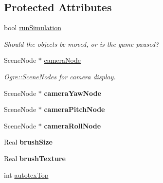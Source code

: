 \subsection*{\-Protected \-Attributes}
\begin{DoxyCompactItemize}
\item 
\hypertarget{classGame_a605bb1f3182700d52a031948b02c3fae}{
bool \hyperlink{classGame_a605bb1f3182700d52a031948b02c3fae}{run\-Simulation}}
\label{d9/d68/classGame_a605bb1f3182700d52a031948b02c3fae}

\begin{DoxyCompactList}\small\item\em \-Should the objects be moved, or is the game paused? \end{DoxyCompactList}\item 
\hypertarget{classGame_aaf382d31f78d134c461abc03b23ca27c}{
\-Scene\-Node $\ast$ \hyperlink{classGame_aaf382d31f78d134c461abc03b23ca27c}{camera\-Node}}
\label{d9/d68/classGame_aaf382d31f78d134c461abc03b23ca27c}

\begin{DoxyCompactList}\small\item\em \-Ogre\-::\-Scene\-Nodes for camera display. \end{DoxyCompactList}\item 
\hypertarget{classGame_a58d8f80fc46eba4437edf250e9bb28e1}{
\-Scene\-Node $\ast$ {\bfseries camera\-Yaw\-Node}}
\label{d9/d68/classGame_a58d8f80fc46eba4437edf250e9bb28e1}

\item 
\hypertarget{classGame_a3df6ea2d5c8b8186d8f31fb06f8639b1}{
\-Scene\-Node $\ast$ {\bfseries camera\-Pitch\-Node}}
\label{d9/d68/classGame_a3df6ea2d5c8b8186d8f31fb06f8639b1}

\item 
\hypertarget{classGame_a12385887443190a547166593eafd61d3}{
\-Scene\-Node $\ast$ {\bfseries camera\-Roll\-Node}}
\label{d9/d68/classGame_a12385887443190a547166593eafd61d3}

\item 
\hypertarget{classGame_a1f866d9b73f61974fe2c86854cde433d}{
\-Real {\bfseries brush\-Size}}
\label{d9/d68/classGame_a1f866d9b73f61974fe2c86854cde433d}

\item 
\hypertarget{classGame_a88ca7c139b149efa20c94ecbd6fc5b7f}{
\-Real {\bfseries brush\-Texture}}
\label{d9/d68/classGame_a88ca7c139b149efa20c94ecbd6fc5b7f}

\item 
\hypertarget{classGame_a7035a0ca54eee1c5042d42e057082345}{
int \hyperlink{classGame_a7035a0ca54eee1c5042d42e057082345}{autotex\-Top}}
\label{d9/d68/classGame_a7035a0ca54eee1c5042d42e057082345}


\end{DoxyCompactItemize}
